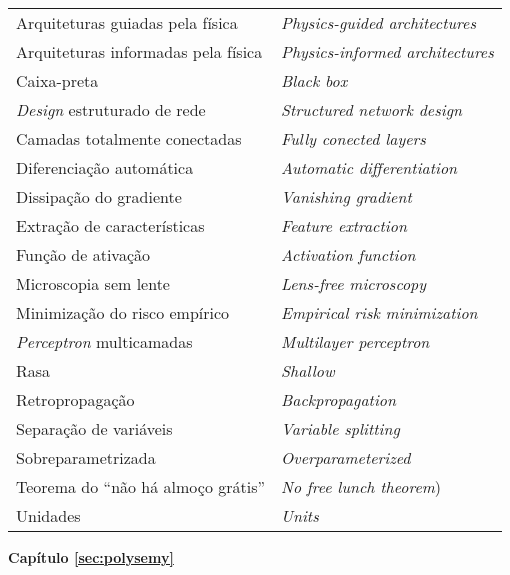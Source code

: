 \begin{table}[H]
\begin{center}
\begin{tabular}{ l l }
Arquiteturas guiadas pela física & \textit{Physics-guided architectures}\\
Arquiteturas informadas pela física & \textit{Physics-informed architectures}\\
Caixa-preta &  \textit{Black box}\\
\textit{Design} estruturado de rede & \textit{Structured network design}\\
Camadas totalmente conectadas & \textit{Fully conected layers} \\ 
Diferenciação automática & \textit{Automatic differentiation}\\
Dissipação do gradiente & \textit{Vanishing gradient}\\
Extração de características & \textit{Feature extraction}\\
Função de ativação & \textit{Activation function} \\
Microscopia sem lente & \textit{Lens-free microscopy}\\
Minimização do risco empírico & \textit{Empirical risk minimization} \\
\textit{Perceptron} multicamadas & \textit{Multilayer perceptron}\\
Rasa &  \textit{Shallow} \\
Retropropagação & \textit{Backpropagation}\\
Separação de variáveis & \textit{Variable splitting}\\
Sobreparametrizada  & \textit{Overparameterized} \\
Teorema do ``não há almoço grátis'' & \textit{No free lunch theorem})\\
Unidades & \textit{Units} \\
\end{tabular}
\end{center}
\end{table}






\newpage

\begin{center}
\textbf{Capítulo \ref{sec:polysemy}}
\end{center}

